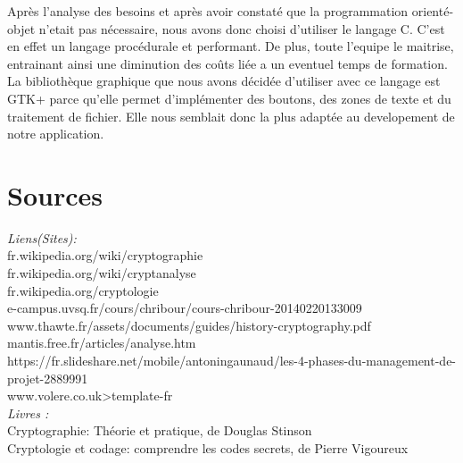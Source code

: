 \documentclass[a4]{article}
\begin{document}
			
			 Après l'analyse des besoins et après avoir constaté que la programmation orienté-objet n'etait pas nécessaire, nous avons donc choisi d'utiliser le langage C.
			C'est en effet un langage procédurale et performant.
			De plus, toute l'equipe le maitrise, entrainant ainsi une diminution des coûts liée a un eventuel temps de formation.
			La bibliothèque graphique que nous avons décidée d'utiliser avec ce langage est GTK+ parce qu'elle permet d'implémenter des boutons, des zones de texte et du traitement de fichier.
			Elle nous semblait donc la plus adaptée au developement de notre application.
			 
			\section{Sources}
\textit{Liens(Sites):}\\
fr.wikipedia.org/wiki/cryptographie\\
fr.wikipedia.org/wiki/cryptanalyse\\
fr.wikipedia.org/cryptologie\\
e-campus.uvsq.fr/cours/chribour/cours-chribour-20140220133009\\
www.thawte.fr/assets/documents/guides/history-cryptography.pdf\\
mantis.free.fr/articles/analyse.htm\\
https://fr.slideshare.net/mobile/antoningaunaud/les-4-phases-du-management-de-projet-2889991\\
www.volere.co.uk>template-fr\\

\textit{Livres :}\\
Cryptographie: Théorie et pratique, de Douglas Stinson\\
Cryptologie et codage: comprendre les codes secrets, de Pierre Vigoureux
\end{document}
